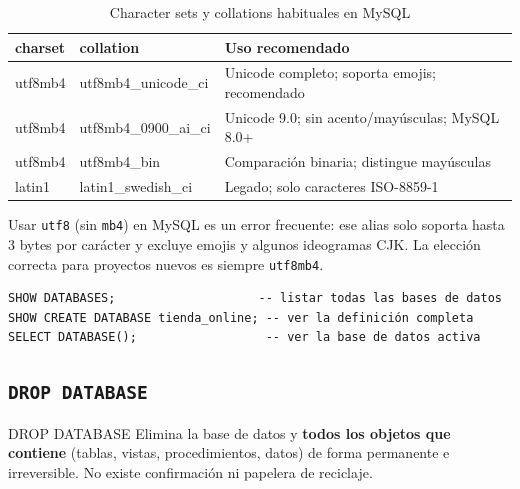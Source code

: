 \begin{table}[H]
  \centering
  \caption{Character sets y collations habituales en MySQL}
  \renewcommand{\arraystretch}{1.3}
  \begin{tabularx}{\textwidth}{>{\ttfamily}l >{\ttfamily}l X}
    \toprule
    \textbf{charset}  & \textbf{collation}          & \textbf{Uso recomendado}                        \\
    \midrule
    utf8mb4  & utf8mb4\_unicode\_ci  & Unicode completo; soporta emojis; recomendado   \\
    utf8mb4  & utf8mb4\_0900\_ai\_ci & Unicode 9.0; sin acento/mayúsculas; MySQL 8.0+  \\
    utf8mb4  & utf8mb4\_bin          & Comparación binaria; distingue mayúsculas       \\
    latin1   & latin1\_swedish\_ci   & Legado; solo caracteres ISO-8859-1              \\
    \bottomrule
  \end{tabularx}
\end{table}

\begin{nota}
  Usar \texttt{utf8} (sin \texttt{mb4}) en MySQL es un error frecuente: ese
  alias solo soporta hasta 3 bytes por carácter y excluye emojis y algunos
  ideogramas CJK. La elección correcta para proyectos nuevos es siempre
  \texttt{utf8mb4}.
\end{nota}

\begin{lstlisting}[style=sql, caption={Comandos de exploración de bases de datos}]
SHOW DATABASES;                    -- listar todas las bases de datos
SHOW CREATE DATABASE tienda_online; -- ver la definición completa
SELECT DATABASE();                  -- ver la base de datos activa
\end{lstlisting}

\subsection{\texttt{DROP DATABASE}}

\begin{definicion}{DROP DATABASE}
  Elimina la base de datos y \textbf{todos los objetos que contiene}
  (tablas, vistas, procedimientos, datos) de forma permanente e
  irreversible. No existe confirmación ni papelera de reciclaje.
\end{definicion}

